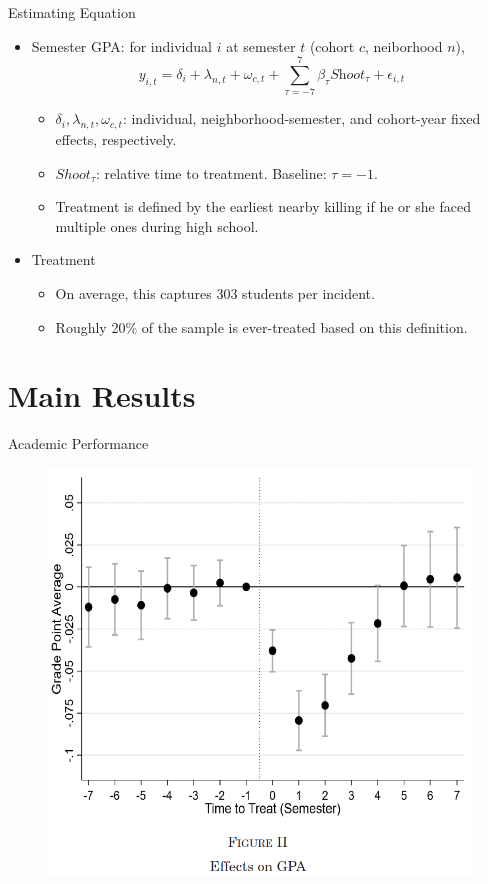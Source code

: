 \documentclass[dvipdfmx]{beamer}
\begin{document}
\begin{frame}{Estimating Equation}
  \begin{itemize}
    \item Semester GPA: for individual $i$ at semester $t$ (cohort $c$, neiborhood $n$),
    \[y_{i, t} = \delta_i + \lambda_{n, t} + \omega_{c, t} + \sum_{\tau = -7}^7 \beta_{\tau} \textit{Shoot}_{\tau} + \epsilon_{i, t}\]
    \begin{itemize}
      \item $\delta_i, \lambda_{n, t}, \omega_{c, t}$: individual, neighborhood-semester, and cohort-year fixed effects, respectively.
      \item ${Shoot}_{\tau}$: relative time to treatment. Baseline: $\tau = -1$.
      \item Treatment is defined by the earliest nearby killing if he or she faced multiple ones during high school.
    \end{itemize}
    \item Treatment 
    \begin{itemize}
      \item On average, this captures 303 students per incident.
      \item Roughly 20\% of the sample is ever-treated based on this
      definition.
    \end{itemize}
  \end{itemize}
\end{frame}

\section{Main Results}
\frame{\sectionpage}

\begin{frame}{Academic Performance}
  \begin{figure}
    \centering
    \includegraphics[scale = .55]{fig_tab/os20220113/F2}
  \end{figure}
\end{frame}
\end{document}

